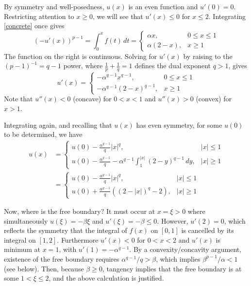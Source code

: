 \documentclass[11pt]{amsart}
\begin{document}
By symmetry and well-posedness, $u(x)$ is an even function and $u'(0)=0$.  Restricting attention to $x\ge 0$, we will see that $u'(x)\le 0$ for $x\le 2$.  Integrating \eqref{concrete} once gives
    $$\left(-u'(x)\right)^{p-1} = \int_0^x f(t)\,dt = \begin{cases} \alpha x, & 0 \le x \le 1 \\ \alpha (2 - x), & x \ge 1\end{cases}$$
The function on the right is continuous.  Solving for $u'(x)$ by raising to the $(p-1)^{-1} = q-1$ power, where $\frac{1}{p} + \frac{1}{q} = 1$ defines the dual exponent $q>1$, gives
    $$u'(x) = \begin{cases} - \alpha^{q-1} x^{q-1}, & 0 \le x \le 1 \\ -\alpha^{q-1} (2 - x)^{q-1}, & x \ge 1\end{cases}$$
Note that $u''(x) < 0$ (concave) for $0 < x < 1$ and $u''(x)>0$ (convex) for $x>1$.

Integrating again, and recalling that $u(x)$ has even symmetry, for some $u(0)$ to be determined, we have
\begin{align*}
u(x) &= \begin{cases} u(0) - \frac{\alpha^{q-1}}{q} |x|^q, & |x| \le 1 \\
                      u(0) - \frac{\alpha^{q-1}}{q} -\alpha^{q-1} \int_1^{|x|} (2 - y)^{q-1}\,dy, & |x| \ge 1\end{cases} \\
     &= \begin{cases} u(0) - \frac{\alpha^{q-1}}{q} |x|^q, & |x| \le 1 \\
                      u(0) + \frac{\alpha^{q-1}}{q} \left( (2 - |x|)^q - 2 \right), & |x| \ge 1\end{cases}
\end{align*}

Now, where is the free boundary?  It must occur at $x=\xi>0$ where simultaneously $u(\xi)=-\beta \xi$ and $u'(\xi)=-\beta\le 0$.  However, $u'(2)=0$, which reflects the symmetry that the integral of $f(x)$ on $[0,1]$ is cancelled by its integral on $[1,2]$.  Furthermore $u'(x)<0$ for $0<x<2$ and $u'(x)$ is minimum at $x=1$, with $u'(1) = -\alpha^{q-1}$.  By a convexity/concavity argument, existence of the free boundary requires $\alpha^{q-1}/q>\beta$, which implies $\beta^{p-1}/\alpha < 1$ (see below).  Then, because $\beta \ge 0$, tangency implies that the free boundary is at some $1 < \xi \le 2$, and the above calculation is justified.
\end{document}
